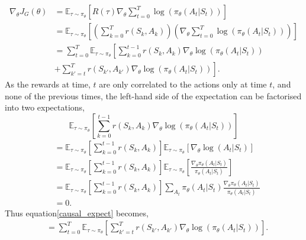 \begin{align}
	\nabla_{\theta} J_G(\theta) & = \mathbb{E}_{\tau \sim \pi_{\theta}} \left[ R(\tau) \nabla_\theta \sum_{t=0}^ T \log(\pi_\theta(A_t|S_t))\right]                                               \\
	                            & = \mathbb{E}_{\tau \sim \pi_{\theta}} \left[ \left(\sum_{k = 0}^T r(S_k, A_k)\right) \left(\nabla_\theta \sum_{t=0}^ T \log(\pi_\theta(A_t|S_t))\right) \right] \\
	                            & = \sum_{t = 0} ^T \mathbb{E}_{\tau \sim \pi_\theta} \left[ \sum_{k = 0} ^ {t-1} r(S_k, A_k) \nabla_\theta \log(\pi_\theta(A_t|S_t)) \right.                     \\
	                            & \left. + \sum_{k' = t} ^ T r(S_{k'}, A_{k'}) \nabla_\theta \log(\pi_\theta(A_t| S_t)) \right ]. \label{causal_expect}
\end{align}
As the rewards at time, $t$ are only correlated to the actions only at time $t$, and none of the previous times, the left-hand side of the expectation can be factorised into two expectations,
\begin{equation}
	\mathbb{E}_{\tau \sim \pi_\theta} \left[ \sum_{k = 0} ^ {t-1} r(S_k, A_k) \nabla_\theta \log(\pi_\theta(A_t|S_t))\right]
\end{equation}
\begin{align*}
	 & = \mathbb{E}_{\tau \sim \pi_\theta} \left[ \sum_{k=0}^{t-1}r(S_k, A_k)\right] \mathbb{E}_{\tau \sim \pi_\theta} \left[ \nabla_\theta \log(A_t| S_t) \right]                                                                 \\
	 & = \mathbb{E}_{\tau \sim \pi_\theta} \left[ \sum_{k=0}^{t-1}r(S_k, A_k)\right] \mathbb{E}_{\tau \sim \pi_\theta} \left[ \frac{\nabla_\theta \pi_\theta(A_t| S_t)}{\pi_\theta(A_t| S_t)} \right] \label{score_function_lemma} \\
	 & = \mathbb{E}_{\tau \sim \pi_\theta} \left[ \sum_{k=0}^{t-1}r(S_k, A_k)\right] \sum_{A_t} \pi_\theta(A_t|S_t)\frac{\nabla_\theta \pi_\theta(A_t| S_t)}{\pi_\theta(A_t| S_t)}                                                 \\
	 & = 0.
\end{align*}
Thus equation\ref{causal_expect} becomes,
\begin{align}
	 & = \sum_{t = 0} ^T \mathbb{E}_{\tau \sim \pi_\theta} \left [  \sum_{k' = t} ^T  r(S_{k'}, A_{k'}) \nabla_\theta \log(\pi_\theta(A_t| S_t)) \right ].
\end{align}
